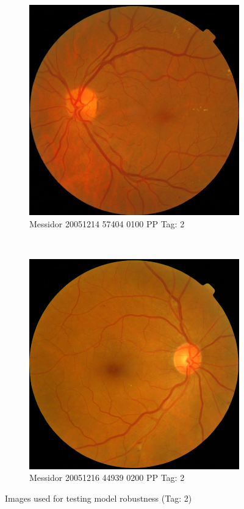 \begin{figure}[ht!]
	\begin{subfigure}[b]{0.4\textwidth}
		\centering
		\includegraphics[width=\textwidth]{Figures/chapter_stability/20051214_57404_0100_PP/20051214_57404_0100_PP.jpeg}
		\caption{Messidor 20051214 57404 0100 PP Tag: 2}		
	\end{subfigure}	~
	\begin{subfigure}[b]{0.4\textwidth}
		\centering
		\includegraphics[width=\textwidth]{Figures/chapter_stability/20051216_44939_0200_PP/20051216_44939_0200_PP.jpeg}
		\caption{Messidor 20051216 44939 0200 PP Tag: 2}		
	\end{subfigure}
	\hfill 
	\caption{Images used for testing model robustness (Tag: 2)}  
	\label{sta:fig:imgs2} 
\end{figure}

